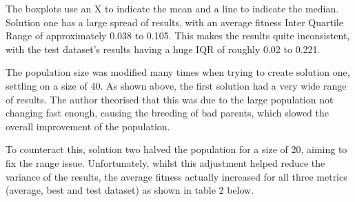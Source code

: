 \documentclass[sigconf]{acmart}
\begin{document}
The boxplots use an X to indicate the mean and a line to indicate the median. Solution one has a large spread of results, with an average fitness Inter Quartile Range of approximately 0.038 to 0.105. This makes the results quite inconsistent, with the test dataset's results having a huge IQR of roughly 0.02 to 0.221.

The population size was modified many times when trying to create solution one, settling on a size of 40. As shown above, the first solution had a very wide range of results. The author theorised that this was due to the large population not changing fast enough, causing the breeding of bad parents, which slowed the overall improvement of the population.

To counteract this, solution two halved the population for a size of 20, aiming to fix the range issue. Unfortunately, whilst this adjustment helped reduce the variance of the results, the average fitness actually increased for all three metrics (average, best and test dataset) as shown in table 2 below.
\end{document}
